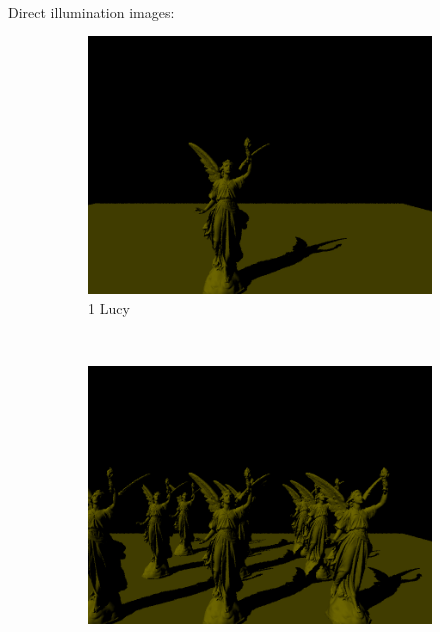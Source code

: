 \documentclass[a4paper, oneside, 10pt]{article}
\begin{document}
\paragraph{} Direct illumination images:
\begin{figure}[h]
	\centering
        \begin{subfigure}[b]{0.3\textwidth}
                \includegraphics[width=\textwidth]{d1lucy}
                \caption{1 Lucy}
                \label{fig:d1lucy}
        \end{subfigure}%
        ~ %
        \begin{subfigure}[b]{0.3\textwidth}
                \includegraphics[width=\textwidth]{d9lucy}

\end{subfigure}
\end{figure}
\end{document}
